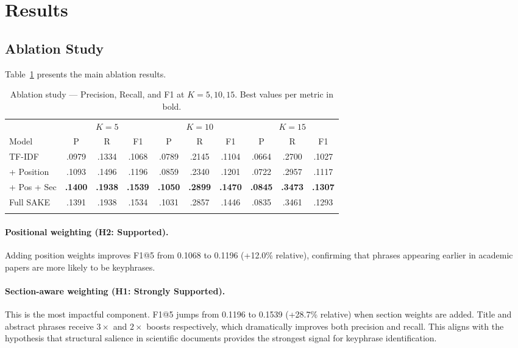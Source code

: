 \documentclass[pdflatex,sn-mathphys-num]{sn-jnl}
\begin{document}
\section{Results}\label{sec:results}

\subsection{Ablation Study}\label{sec:ablation}

Table~\ref{tab:ablation} presents the main ablation results.

\begin{table}[h]
\caption{Ablation study --- Precision, Recall, and F1 at $K=5,10,15$. Best values per metric
in bold.}\label{tab:ablation}
\begin{tabular*}{\textwidth}{@{\extracolsep\fill}lccccccccc@{}}
\toprule
 & \multicolumn{3}{c}{$K=5$} & \multicolumn{3}{c}{$K=10$} & \multicolumn{3}{c}{$K=15$} \\
\cmidrule{2-4}\cmidrule{5-7}\cmidrule{8-10}
Model & P & R & F1 & P & R & F1 & P & R & F1 \\
\midrule
TF-IDF              & .0979 & .1334 & .1068 & .0789 & .2145 & .1104 & .0664 & .2700 & .1027 \\
+ Position          & .1093 & .1496 & .1196 & .0859 & .2340 & .1201 & .0722 & .2957 & .1117 \\
+ Pos + Sec         & \textbf{.1400} & \textbf{.1938} & \textbf{.1539} & \textbf{.1050} & \textbf{.2899} & \textbf{.1470} & \textbf{.0845} & \textbf{.3473} & \textbf{.1307} \\
Full SAKE           & .1391 & .1938 & .1534 & .1031 & .2857 & .1446 & .0835 & .3461 & .1293 \\
\botrule
\end{tabular*}
\end{table}

\paragraph{Positional weighting (H2: Supported).}
Adding position weights improves F1@5 from 0.1068 to 0.1196 (+12.0\% relative), confirming that
phrases appearing earlier in academic papers are more likely to be keyphrases.

\paragraph{Section-aware weighting (H1: Strongly Supported).}
This is the most impactful component. F1@5 jumps from 0.1196 to 0.1539 (+28.7\% relative) when
section weights are added. Title and abstract phrases receive $3\times$ and $2\times$ boosts
respectively, which dramatically improves both precision and recall. This aligns with the hypothesis
that structural salience in scientific documents provides the strongest signal for keyphrase
identification.
\end{document}
